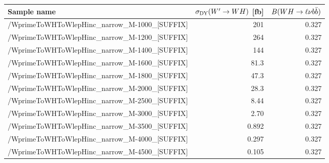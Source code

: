 \footnotesize
\begin{tabular}{lrr}
  \hline
  \textbf{Sample name} & $\sigma_{\mathrm{DY}}(W'\to WH)$ [fb] & $B(WH\to\ell\nu b\bar{b})$ \\
  \hline
  \ttfamily/WprimeToWHToWlepHinc\_narrow\_M-1000\_[SUFFIX] & 201 & 0.327  \\
  \ttfamily/WprimeToWHToWlepHinc\_narrow\_M-1200\_[SUFFIX] & 264 & 0.327  \\
  \ttfamily/WprimeToWHToWlepHinc\_narrow\_M-1400\_[SUFFIX] & 144 & 0.327  \\
  \ttfamily/WprimeToWHToWlepHinc\_narrow\_M-1600\_[SUFFIX] & 81.3 & 0.327  \\
  \ttfamily/WprimeToWHToWlepHinc\_narrow\_M-1800\_[SUFFIX] & 47.3 & 0.327  \\
  \ttfamily/WprimeToWHToWlepHinc\_narrow\_M-2000\_[SUFFIX] & 28.3 & 0.327  \\
  \ttfamily/WprimeToWHToWlepHinc\_narrow\_M-2500\_[SUFFIX] & 8.44 & 0.327  \\
  \ttfamily/WprimeToWHToWlepHinc\_narrow\_M-3000\_[SUFFIX] & 2.70 & 0.327  \\
  \ttfamily/WprimeToWHToWlepHinc\_narrow\_M-3500\_[SUFFIX] & 0.892 & 0.327  \\
  \ttfamily/WprimeToWHToWlepHinc\_narrow\_M-4000\_[SUFFIX] & 0.297 & 0.327  \\
  \ttfamily/WprimeToWHToWlepHinc\_narrow\_M-4500\_[SUFFIX] & 0.105 & 0.327  \\
  \hline
\end{tabular}
